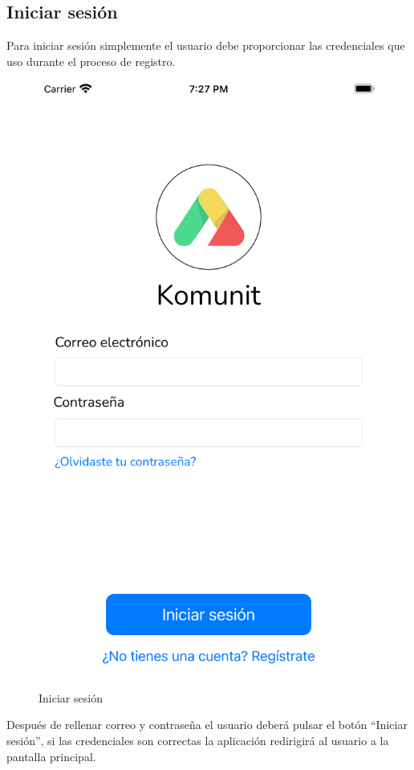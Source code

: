 \begin{appendices}
\section{Iniciar sesión}
Para iniciar sesión simplemente el usuario debe proporcionar las credenciales que uso durante el proceso de registro.
\begin{figure}[H]
        \centering
        \includegraphics[cframe=black 2pt,width=0.3\linewidth]{images/manual/login.png}
        \caption{Iniciar sesión}
        \label{fig:login}
\end{figure}
Después de rellenar correo y contraseña el usuario deberá pulsar el botón ``Iniciar sesión'', si las credenciales son correctas la aplicación redirigirá al usuario a la pantalla principal.


\end{appendices}
